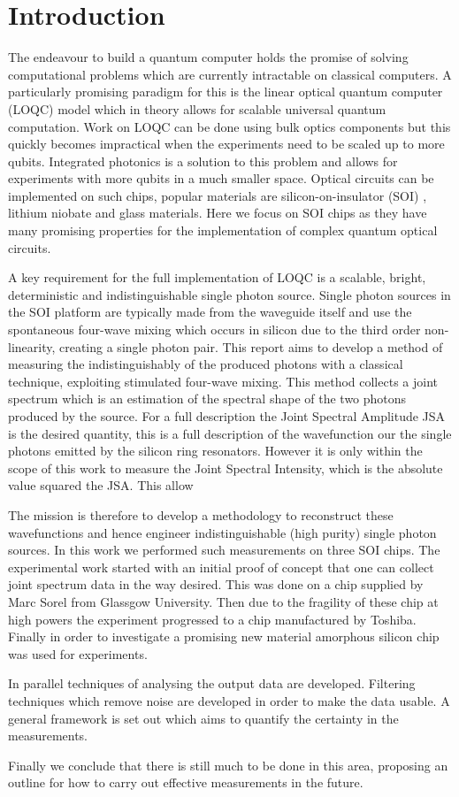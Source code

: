 \newpage
\section{Introduction}
The endeavour to build a quantum computer holds the promise of solving computational problems which are currently intractable on classical computers. A particularly promising paradigm for this is the linear optical quantum computer (LOQC) model which in theory allows for scalable universal quantum computation. Work on LOQC can be done using bulk optics components but this quickly becomes impractical when the experiments need to be scaled up to more qubits. Integrated photonics is a solution to this problem and allows for experiments with more qubits in a much smaller space. Optical circuits can be implemented on such chips, popular materials are silicon-on-insulator (SOI) , lithium niobate and glass materials. Here we focus on SOI chips as they have many promising properties for the implementation of complex quantum optical circuits.

A key requirement for the full implementation of LOQC is a scalable, bright, deterministic and indistinguishable single photon source. Single photon sources in the SOI platform are typically made from the waveguide itself and use the spontaneous four-wave mixing which occurs in silicon due to the third order non-linearity, creating a single photon pair. This report aims to develop a method of measuring the indistinguishably of the produced photons with a classical technique, exploiting stimulated four-wave mixing. This method collects a joint spectrum which is an estimation of the spectral shape of the two photons produced by the source. For a full description the Joint Spectral Amplitude JSA is the desired quantity, this is a full description of the wavefunction our the single photons emitted by the silicon ring resonators. However it is only within the scope of this work to measure the Joint Spectral Intensity, which is the absolute value squared the JSA. This allow

The mission is therefore to develop a methodology to reconstruct these wavefunctions and hence engineer indistinguishable (high purity) single photon sources. In this work we performed such measurements on three SOI chips. The experimental work started with an initial proof of concept that one can collect joint spectrum data in the way desired. This was done on a chip supplied by Marc Sorel from Glassgow University. Then due to the fragility of these chip at high powers the experiment progressed to a chip manufactured by Toshiba. Finally in order to investigate a promising new material amorphous silicon chip was used for experiments. 

In parallel techniques of analysing the output data are developed. Filtering techniques which remove noise are developed in order to make the data usable. A general framework is set out which aims to quantify the certainty in the measurements.

Finally we conclude that there is still much to be done in this area, proposing an outline for how to carry out effective measurements in the future.


